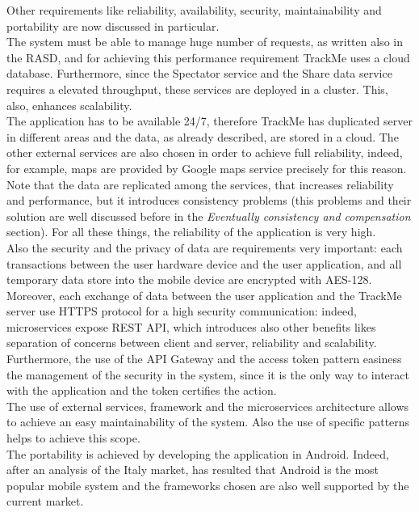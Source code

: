 Other requirements like reliability, availability, security, maintainability and portability are now discussed in particular. \\
The system must be able to manage huge number of requests, as written also in the RASD, and for achieving this performance requirement TrackMe
uses a cloud database. 
Furthermore, since the Spectator service and the Share data service requires a elevated throughput, these services are deployed in a
cluster.
This, also, enhances scalability.\\ 
The application has to be available 24/7, therefore TrackMe has duplicated server in different areas and the data, as already described, are
stored in a cloud. 
The other external services are also chosen in order to achieve full reliability, indeed, for example, maps are provided by Google maps
service precisely for this reason. 
Note that the data are replicated among the services, that increases reliability and performance, but it introduces consistency problems
(this problems and their solution are well discussed before in the \textit{Eventually consistency and compensation } section).
For all these things, the reliability of the application is very high.\\ 
Also the security and the privacy of data are requirements very
important: each transactions between the user hardware device and the user application, and all temporary data store into the mobile device
are encrypted with AES-128. Moreover, each exchange of data between the user application and the TrackMe server use HTTPS protocol for a high
security communication: indeed, microservices expose REST API, which introduces also other benefits likes separation of concerns between
client and server, reliability and scalability. 
Furthermore, the use of the API Gateway and the access token pattern easiness the management of the security in the system, since it is the
only way to interact with the application and the token certifies the action.\\ 
The use of external services, framework and the microservices architecture allows to achieve an easy maintainability of the system. 
Also the use of specific patterns helps to achieve this scope.\\
The portability is achieved by developing the application in Android. 
Indeed, after an analysis of the Italy market, has resulted that Android is the most popular mobile system and the frameworks chosen are also
well supported by the current market.
